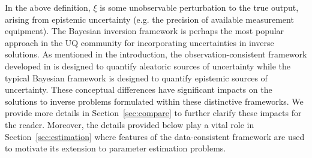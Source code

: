 In the above definition, $\xi$ is some unobservable perturbation to the true output, arising from epistemic uncertainty (e.g. the precision of available measurement equipment).
The Bayesian inversion framework  is perhaps the most popular approach in the UQ community for incorporating uncertainties in inverse solutions.
As mentioned in the introduction, the observation-consistent framework developed in \cite{BJW18a, BJW18b, BWY20} is designed to quantify aleatoric sources of uncertainty while the typical Bayesian framework \cite{0266-5611-7-5-003,
 Kennedy_O_JRSSSB_2001,Tarantola_book, MNR07, CDS10,starktenorio,
 AlexanderianPetraStadlerEtAl14, Bui-ThanhGhattas14, Ernst2014,
 0266-5611-30-11-110301, ROM:CMW_2016, Stuart_Bayesian,
 cockayneoatessullivangirolami} is designed to quantify epistemic sources of uncertainty.
These conceptual differences have significant impacts on the solutions to inverse problems formulated within these distinctive frameworks.
We provide more details in Section~\ref{sec:compare} to further clarify these impacts for the reader.
Moreover, the details provided below play a vital role in Section~\ref{sec:estimation} where features of the data-consistent framework are used to motivate its extension to parameter estimation problems.

\FloatBarrier
